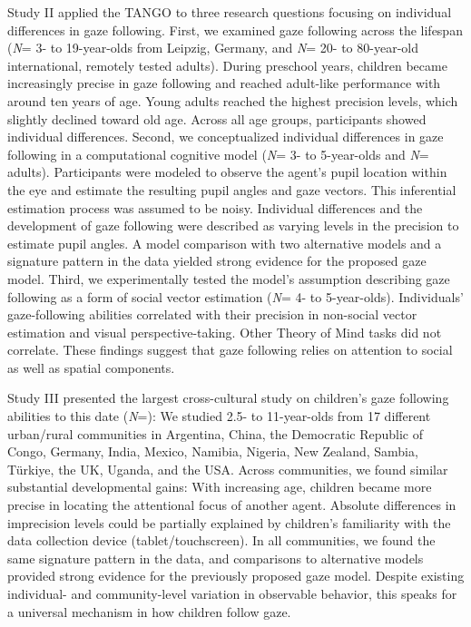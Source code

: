 \documentclass[
]{scrbook}
\begin{document}
Study II applied the TANGO to three research questions focusing on individual differences in gaze following. First, we examined gaze following across the lifespan (\emph{N}\thinspace = 3- to 19-year-olds from Leipzig, Germany, and \emph{N}\thinspace = 20- to 80-year-old international, remotely tested adults). During preschool years, children became increasingly precise in gaze following and reached adult-like performance with around ten years of age. Young adults reached the highest precision levels, which slightly declined toward old age. Across all age groups, participants showed individual differences. Second, we conceptualized individual differences in gaze following in a computational cognitive model (\emph{N}\thinspace = 3- to 5-year-olds and \emph{N}\thinspace = adults). Participants were modeled to observe the agent's pupil location within the eye and estimate the resulting pupil angles and gaze vectors. This inferential estimation process was assumed to be noisy. Individual differences and the development of gaze following were described as varying levels in the precision to estimate pupil angles. A model comparison with two alternative models and a signature pattern in the data yielded strong evidence for the proposed gaze model. Third, we experimentally tested the model's assumption describing gaze following as a form of social vector estimation (\emph{N}\thinspace = 4- to 5-year-olds). Individuals' gaze-following abilities correlated with their precision in non-social vector estimation and visual perspective-taking. Other Theory of Mind tasks did not correlate. These findings suggest that gaze following relies on attention to social as well as spatial components.

Study III presented the largest cross-cultural study on children's gaze following abilities to this date (\emph{N}\thinspace =): We studied 2.5- to 11-year-olds from 17 different urban/rural communities in Argentina, China, the Democratic Republic of Congo, Germany, India, Mexico, Namibia, Nigeria, New Zealand, Sambia, Türkiye, the UK, Uganda, and the USA. Across communities, we found similar substantial developmental gains: With increasing age, children became more precise in locating the attentional focus of another agent. Absolute differences in imprecision levels could be partially explained by children's familiarity with the data collection device (tablet/touchscreen). In all communities, we found the same signature pattern in the data, and comparisons to alternative models provided strong evidence for the previously proposed gaze model. Despite existing individual- and community-level variation in observable behavior, this speaks for a universal mechanism in how children follow gaze.
\end{document}

